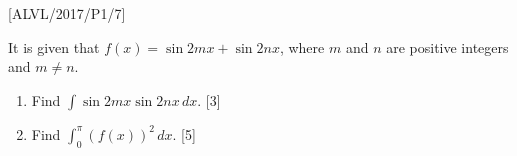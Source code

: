 \item {[}ALVL/2017/P1/7{]}

It is given that $f\left(x\right)=\sin2mx+\sin2nx$, where $m$ and
$n$ are positive integers and $m\neq n$. 
\begin{enumerate}
\item Find $\int\sin2mx\sin2nx\,dx$. \hfill{}{[}3{]}
\item Find $\int_{0}^{\pi}\left(f\left(x\right)\right)^{2}\,dx$.\hfill{}
{[}5{]}
\end{enumerate}
